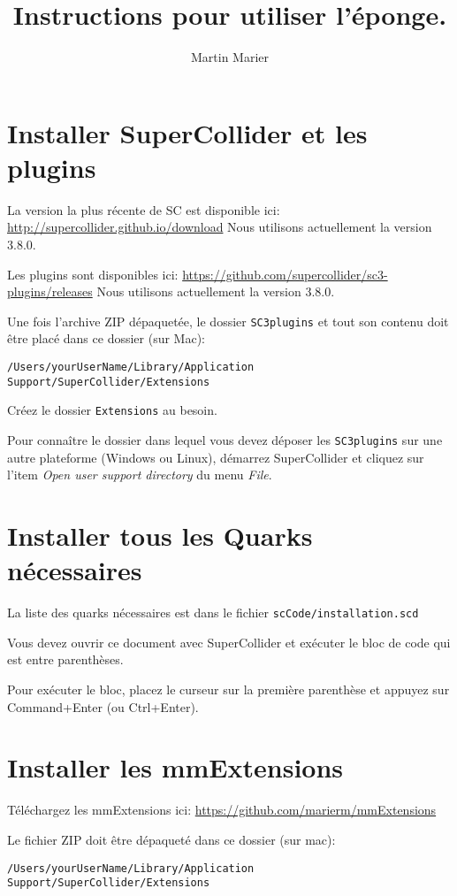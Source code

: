 \documentclass[11pt]{article}
\author{Martin Marier}
\date{}
\title{Instructions pour utiliser l'éponge.}
\begin{document}
\maketitle

\section{Installer SuperCollider et les plugins}
\label{sec:orge84f0c0}
La version la plus récente de SC est disponible ici:
\url{http://supercollider.github.io/download} Nous utilisons actuellement la
version 3.8.0.

Les plugins sont disponibles ici:
\url{https://github.com/supercollider/sc3-plugins/releases} Nous utilisons
actuellement la version 3.8.0.

Une fois l'archive ZIP dépaquetée, le dossier \texttt{SC3plugins} et tout
son contenu doit être placé dans ce dossier (sur Mac):

\texttt{/Users/yourUserName/Library/Application Support/SuperCollider/Extensions}

Créez le dossier \texttt{Extensions} au besoin.

Pour connaître le dossier dans lequel vous devez déposer les
\texttt{SC3plugins} sur une autre plateforme (Windows ou Linux), démarrez
SuperCollider et cliquez sur l'item \emph{Open user support directory} du
menu \emph{File}.

\section{Installer tous les Quarks nécessaires}
\label{sec:orgd7692ea}
La liste des quarks nécessaires est dans le fichier
\texttt{scCode/installation.scd}

Vous devez ouvrir ce document avec SuperCollider et exécuter le bloc de code
qui est entre parenthèses.

Pour exécuter le bloc, placez le curseur sur la première parenthèse et
appuyez sur Command+Enter (ou Ctrl+Enter).

\section{Installer les mmExtensions}
\label{sec:org8657fd7}
Téléchargez les mmExtensions ici: \url{https://github.com/marierm/mmExtensions}

Le fichier ZIP doit être dépaqueté dans ce dossier (sur mac):

\texttt{/Users/yourUserName/Library/Application Support/SuperCollider/Extensions}
\end{document}
